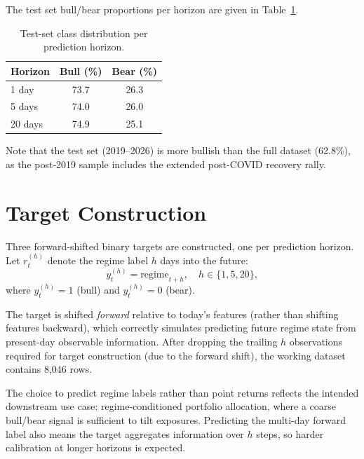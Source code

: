 \documentclass[12pt]{article}
\begin{document}
The test set bull/bear proportions per horizon are given in
Table~\ref{tab:test-balance}.

\begin{table}[H]
\centering
\caption{Test-set class distribution per prediction horizon.}
\label{tab:test-balance}
\begin{tabular}{lcc}
\toprule
Horizon & Bull (\%) & Bear (\%) \\
\midrule
1 day  & 73.7 & 26.3 \\
5 days & 74.0 & 26.0 \\
20 days & 74.9 & 25.1 \\
\bottomrule
\end{tabular}
\end{table}

Note that the test set (2019--2026) is more bullish than the full dataset (62.8\%),
as the post-2019 sample includes the extended post-COVID recovery rally.

\section{Target Construction}

Three forward-shifted binary targets are constructed, one per prediction horizon.
Let $r_t^{(h)}$ denote the regime label $h$ days into the future:
\begin{equation}
  y_t^{(h)} = \text{regime}_{t+h}, \quad h \in \{1, 5, 20\},
\end{equation}
where $y_t^{(h)} = 1$ (bull) and $y_t^{(h)} = 0$ (bear).

The target is shifted \emph{forward} relative to today's features (rather than
shifting features backward), which correctly simulates predicting future regime
state from present-day observable information.
After dropping the trailing $h$ observations required for target construction
(due to the forward shift), the working dataset contains 8,046 rows.

The choice to predict regime labels rather than point returns reflects the
intended downstream use case: regime-conditioned portfolio allocation, where a
coarse bull/bear signal is sufficient to tilt exposures.
Predicting the multi-day forward label also means the target aggregates
information over $h$ steps, so harder calibration at longer horizons is expected.

\end{document}
